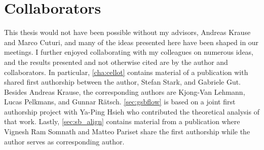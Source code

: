 \section{Collaborators}

This thesis would not have been possible without my advisors, Andreas Krause and Marco Cuturi, and many of the ideas presented here have been shaped in our meetings. I further enjoyed collaborating with my colleagues on numerous ideas, and the results presented and not otherwise cited are by the author and collaborators. In particular, \cref{cha:cellot} contains material of a publication with shared first authorship between the author, Stefan Stark, and Gabriele Gut. Besides Andreas Krause, the corresponding authors are Kjong-Van Lehmann, Lucas Pelkmans, and Gunnar R\"atsch.
\cref{sec:gsbflow} is based on a joint first authorship project with Ya-Ping Hsieh who contributed the theoretical analysis of that work. Lastly, \cref{sec:sb_align} contains material from a publication where Vignesh Ram Somnath and Matteo Pariset share the first authorship while the author serves as corresponding author.

